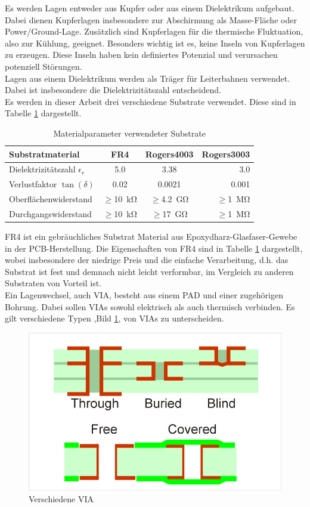 Es werden Lagen entweder aus Kupfer oder aus einem Dielektrikum aufgebaut. Dabei dienen Kupferlagen insbesondere zur Abschirmung als Masse-Fläche oder Power/Ground-Lage. Zusätzlich sind Kupferlagen für die thermische Fluktuation, also zur Kühlung, geeignet. Besonders wichtig ist es, keine Inseln von Kupferlagen zu erzeugen. Diese Inseln haben kein definiertes Potenzial und verursachen potenziell Störungen. \\
Lagen aus einem Dielektrikum werden als Träger für Leiterbahnen verwendet. Dabei ist insbesondere die Dielektrizitätszahl entscheidend.\\
Es werden in dieser Arbeit drei verschiedene Substrate verwendet. Diese sind in Tabelle \ref{tab:FR4} dargestellt.
\begin{table}[tbp]
  \centering
  \begin{tabular}{lccr}
    Substratmaterial  & FR4 & Rogers4003 &Rogers3003\\
    \hline
    Dielektrizitätszahl $\epsilon_{r}$ & 5.0 & 3.38 & 3.0 \\
    Verlustfaktor $\tan \left( \delta \right)$ & 0.02 & 0.0021& 0.001 \\
    Oberflächenwiderstand & $\geq$\SI{10}{\kilo\ohm}& $\geq$\SI{4.2}{\giga\ohm} & $\geq$\SI{1}{\mega\ohm} \\
    Durchgangswiderstand & $\geq$\SI{10}{\kilo\ohm}&$\geq$\SI{17}{\giga\ohm}& $\geq$\SI{1}{\mega\ohm}\\
  \end{tabular}
  \caption{Materialparameter verwendeter Substrate}
  \label{tab:FR4}
\end{table}
FR4 ist ein gebräuchliches Substrat Material aus Epoxydharz-Glasfaser-Gewebe in der PCB-Herstellung. Die Eigenschaften von FR4 sind in Tabelle \ref{tab:FR4} dargestellt, wobei insbesondere der niedrige Preis und die einfache Verarbeitung, d.h. das Substrat ist fest und demnach nicht leicht verformbar, im Vergleich zu anderen Substraten von Vorteil ist.
\\
Ein Lagenwechsel, auch VIA, besteht aus einem PAD und einer zugehörigen Bohrung. Dabei sollen VIAs sowohl elektrisch als auch thermisch verbinden. Es gilt verschiedene Typen ,Bild \ref{fig:VIA}, von VIAs zu unterscheiden.
\begin{figure}[tbp]
  \centering
  \includegraphics[scale=0.5]{gfx/VIA.png}
  \caption{Verschiedene VIA\cite{VIA}}
  \label{fig:VIA}
\end{figure}
